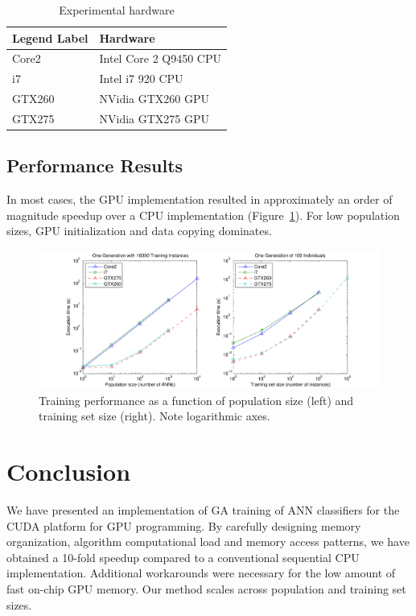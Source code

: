 \documentclass[11pt]{article}       %
\begin{document}
\begin{table}[h]
	\centering
	\begin{tabular}{ll}
	\textbf{Legend Label} & \textbf{Hardware} \\
	\hline
	Core2 & Intel Core 2 Q9450 CPU \\
	i7 & Intel i7 920 CPU \\
	GTX260 & NVidia GTX260 GPU \\
	GTX275 & NVidia GTX275 GPU \\
	\hline
	\end{tabular}
	\caption{Experimental hardware}
	\label{tab:experimental-hardware}
\end{table}

\subsection{Performance Results} \label{performance}
In most cases, the GPU implementation resulted in approximately an order of magnitude speedup over a CPU implementation (Figure~\ref{fig:training-performance}). For low population sizes, GPU initialization and data copying dominates.

\begin{figure}[h]
	\includegraphics[width=\textwidth]{fig-performance}
	\caption{Training performance as a function of population size (left) and training set size (right). Note logarithmic axes.}
	\label{fig:training-performance}
\end{figure}

\section{Conclusion} \label{concl}
We have presented an implementation of GA training of ANN classifiers for the CUDA platform for GPU programming. By carefully designing memory organization, algorithm computational load and memory access patterns, we have obtained a 10-fold speedup compared to a conventional sequential CPU implementation. Additional workarounds were necessary for the low amount of fast on-chip GPU memory. Our method scales across population and training set sizes.
\end{document}
